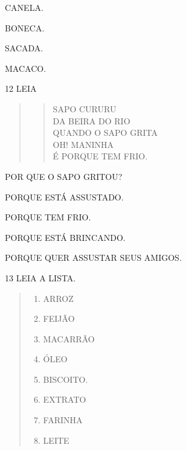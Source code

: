 \begin{escolha}
\item CANELA.

\item BONECA.

\item SACADA.

\item MACACO.
\end{escolha}

\num{12} LEIA

\begin{quote}
\begin{verse}
SAPO CURURU\\
DA BEIRA DO RIO\\
QUANDO O SAPO GRITA\\
OH! MANINHA\\
É PORQUE TEM FRIO.
\end{verse}

\end{quote}

POR QUE O SAPO GRITOU?

\begin{escolha}
\item PORQUE ESTÁ ASSUSTADO. 

\item PORQUE TEM FRIO.

\item PORQUE ESTÁ BRINCANDO.

\item PORQUE QUER ASSUSTAR SEUS AMIGOS.
\end{escolha}

\pagebreak
\num{13} LEIA A LISTA.

\begin{quote}
\begin{enumerate}
\item ARROZ

\item FEIJÃO

\item MACARRÃO

\item ÓLEO

\item BISCOITO.

\item EXTRATO

\item FARINHA

\item LEITE
\end{enumerate}
\end{quote}

